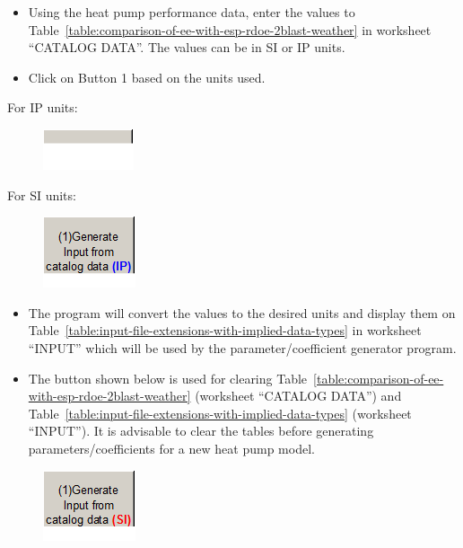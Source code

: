\begin{itemize}
\item
  Using the heat pump performance data, enter the values to Table~\ref{table:comparison-of-ee-with-esp-rdoe-2blast-weather} in worksheet ``CATALOG DATA''. The values can be in SI or IP units.
\item
  Click on Button 1 based on the units used.
\end{itemize}

For IP units:

\begin{figure}[htbp]
\centering
\includegraphics{media/image054.png}
\caption{}
\end{figure}

For SI units:

\begin{figure}[htbp]
\centering
\includegraphics{media/image055.png}
\caption{}
\end{figure}

\begin{itemize}
\item
  The program will convert the values to the desired units and display them on Table~\ref{table:input-file-extensions-with-implied-data-types} in worksheet ``INPUT'' which will be used by the parameter/coefficient generator program.
\item
  The button shown below is used for clearing Table~\ref{table:comparison-of-ee-with-esp-rdoe-2blast-weather} (worksheet ``CATALOG DATA'') and Table~\ref{table:input-file-extensions-with-implied-data-types} (worksheet ``INPUT''). It is advisable to clear the tables before generating parameters/coefficients for a new heat pump model.
\end{itemize}

\begin{figure}[htbp]
\centering
\includegraphics{media/image056.png}
\caption{}
\end{figure}

